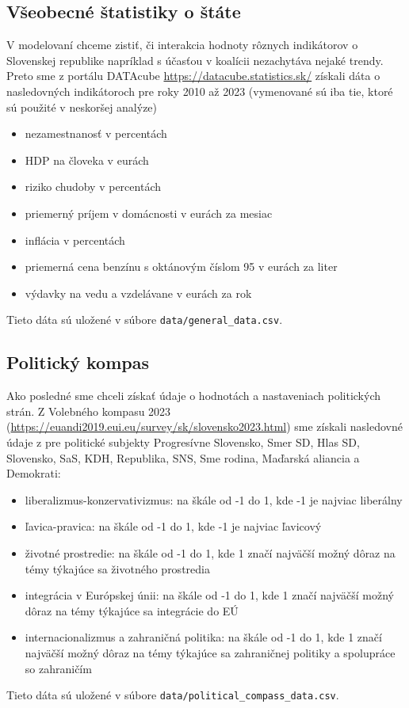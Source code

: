 \documentclass[report.tex]{subfiles}
\begin{document}
\subsection{Všeobecné štatistiky o štáte}

V modelovaní chceme zistiť, či interakcia hodnoty rôznych indikátorov o Slovenskej republike napríklad s účasťou v koalícii nezachytáva nejaké trendy. Preto sme z portálu DATAcube \href{https://datacube.statistics.sk/}{https://datacube.statistics.sk/} získali dáta o nasledovných indikátoroch pre roky 2010 až 2023 (vymenované sú iba tie, ktoré sú použité v neskoršej analýze)

\begin{itemize}
	\item nezamestnanosť v percentách
	\item HDP na človeka v eurách
	\item riziko chudoby v percentách
	\item priemerný príjem v domácnosti v eurách za mesiac
	\item inflácia v percentách
	\item priemerná cena benzínu s oktánovým číslom 95 v eurách za liter
	\item výdavky na vedu a vzdelávane v eurách za rok
\end{itemize}

Tieto dáta sú uložené v súbore \verb*|data/general_data.csv|.

\subsection{Politický kompas}

Ako posledné sme chceli získať údaje o hodnotách a nastaveniach politických strán. Z Volebného kompasu 2023 (\href{https://euandi2019.eui.eu/survey/sk/slovensko2023.html}{https://euandi2019.eui.eu/survey/sk/slovensko2023.html}) sme získali nasledovné údaje z pre politické subjekty Progresívne Slovensko, Smer SD, Hlas SD, Slovensko, SaS, KDH, Republika, SNS, Sme rodina, Maďarská aliancia a Demokrati:

\begin{itemize}
	\item liberalizmus-konzervativizmus: na škále od -1 do 1, kde -1 je najviac liberálny
	\item ľavica-pravica: na škále od -1 do 1, kde -1 je najviac ľavicový
	\item životné prostredie: na škále od -1 do 1, kde 1 značí najväčší možný dôraz na témy týkajúce sa životného prostredia
	\item integrácia v Európskej únii: na škále od -1 do 1, kde 1 značí najväčší možný dôraz na témy týkajúce sa integrácie do EÚ
	\item internacionalizmus a zahraničná politika: na škále od -1 do 1, kde 1 značí najväčší možný dôraz na témy týkajúce sa zahraničnej politiky a spolupráce so zahraničím
\end{itemize}

Tieto dáta sú uložené v súbore \verb*|data/political_compass_data.csv|.
\end{document}
